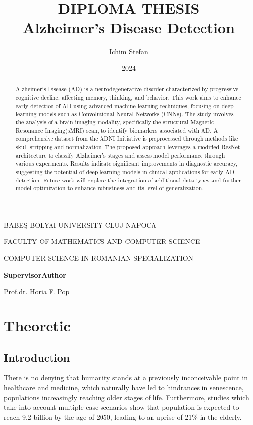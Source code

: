 \documentclass[a4paper, 12pt]{article}
\title{
    DIPLOMA THESIS \\
    Alzheimer's Disease Detection
}
\author{Ichim Ștefan}
\date{2024}
\makeatletter
\renewcommand{\maketitle}{
    \begin{center}
            \normalsize{BABEŞ-BOLYAI UNIVERSITY CLUJ-NAPOCA}\par %
            \normalsize{FACULTY OF MATHEMATICS AND COMPUTER SCIENCE}\par %
            \normalsize{COMPUTER SCIENCE IN ROMANIAN SPECIALIZATION}\par
        \vspace{21em} %

        {\LARGE\@title\par} %
        \vspace{21em} %

        \textbf{Supervisor}\hspace{20em}\textbf{Author}\par
        Prof.dr. Horia F. Pop\hspace{16em}{\large\@author\par} %
        \vspace{3em} %

        {\large\@date\par} %
    \end{center}
}
\makeatother
\begin{document}
\maketitle
\newpage

\begin{abstract}
    Alzheimer's Disease (AD) is a neurodegenerative disorder characterized by progressive cognitive decline, affecting memory, thinking, and behavior.
    This work aims to enhance early detection of AD using advanced machine learning techniques, focusing on deep learning models such as Convolutional
    Neural Networks (CNNs).
    The study involves the analysis of a brain imaging modality, specifically the structural Magnetic Resonance Imaging(sMRI) scan, to identify biomarkers associated with AD.
    A comprehensive dataset from the ADNI Initiative is preprocessed through methods like skull-stripping and normalization.
    The proposed approach leverages a modified ResNet architecture to classify Alzheimer's stages and assess model performance through various experiments.
    Results indicate significant improvements in diagnostic accuracy, suggesting the potential of deep learning models in clinical applications for early AD detection.
    Future work will explore the integration of additional data types and further model optimization to enhance robustness and its level of generalization.
\end{abstract}
\newpage

\tableofcontents
\newpage

\section{Theoretic}
\subsection{Introduction}
There is no denying that humanity stands at a previously inconceivable point in healthcare and medicine,
which naturally have led to hindrances in senescence, populations increasingly reaching older stages of life.
Furthermore, studies which take into account multiple case scenarios show that population is expected to reach
9.2 billion by the age of 2050, leading to an uprise of 21\% in the elderly. \cite{KC2017181}
\end{document}
